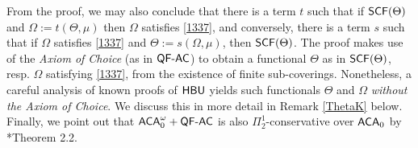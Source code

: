 \documentclass[reqno]{amsart}
\def\ACAo{\textup{\textsf{ACA}}_{0}^{\omega}}
\def\ACA{\textup{\textsf{ACA}}}
\def\QFAC{\textup{\textsf{QF-AC}}}
\def\HBU{\textup{\textsf{HBU}}}
\def\SCF{\textup{\textsf{SCF}}}
\numberwithin{equation}{section}
\numberwithin{thm}{section}
\begin{document}
From the proof, we may also conclude that there is a term $t$ such that if $\SCF(\Theta)$ and $\Omega := t(\Theta,\mu)$ then $\Omega$ satisfies \eqref{1337}, and conversely, there is a term $s$ such that if $\Omega$ satisfies \eqref{1337} and $\Theta := s(\Omega,\mu)$, then $\SCF(\Theta)$. 
The proof makes use of the \emph{Axiom of Choice} (as in $\QFAC$) to obtain a functional $\Theta$ as in $\SCF(\Theta)$, resp. $\Omega$ satisfying \eqref{1337}, from the existence of finite sub-coverings.  
Nonetheless, a careful analysis of known proofs of $\HBU$ yields such  functionals $\Theta$ and $\Omega$ \emph{without the Axiom of Choice}.
We discuss this in more detail in Remark \ref{ThetaK} below.  
Finally, we point out that $\ACAo+\QFAC$ is also $\Pi_{2}^{1}$-conservative over $\ACA_{0}$ by \cite{yamayamaharehare}*{Theorem 2.2}.

\smallskip
\end{document}
